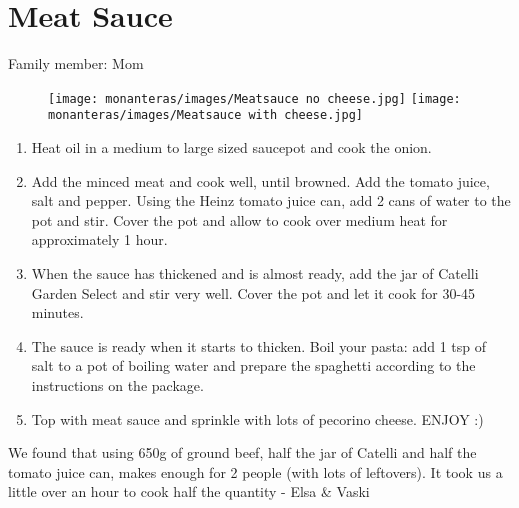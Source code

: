 \chapter{Meat Sauce}
\label{ch:meatsauce}


Family member: Mom

\begin{figure}
    \texttt{[image: monanteras/images/Meatsauce no cheese.jpg]}
    \texttt{[image: monanteras/images/Meatsauce with cheese.jpg]}
\end{figure}

\begin{enumerate}
    \item Heat oil in a medium to large sized saucepot and cook the onion.
    \item Add the minced meat and cook well, until browned. Add the tomato juice, salt and pepper. Using the Heinz tomato juice can, add 2 cans of water to the pot and stir. Cover the pot and allow to cook over medium heat for approximately 1 hour.
    \item When the sauce has thickened and is almost ready, add the jar of Catelli Garden Select and stir very well. Cover the pot and let it cook for 30-45 minutes.
    \item The sauce is ready when it starts to thicken. Boil your pasta: add 1 tsp of salt to a pot of boiling water and prepare the spaghetti according to the instructions on the package.
    \item Top with meat sauce and sprinkle with lots of pecorino cheese. ENJOY :)
\end{enumerate}

We found that using 650g of ground beef, half the jar of Catelli and half the tomato juice can, makes enough for 2 people (with lots of leftovers). It took us a little over an hour to cook half the quantity - Elsa \& Vaski

